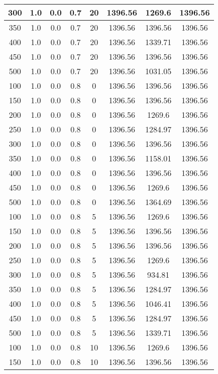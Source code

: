 \documentclass[a4paper, 12pt]{extreport}
\begin{document}
\begin{itemize}
\begin{longtable}{|c|c|c|c|c|c|c|c|}
			300 & 1.0 & 0.0 & 0.7 & 20 & 1396.56 & 1269.6 & 1396.56 \\\hline
			350 & 1.0 & 0.0 & 0.7 & 20 & 1396.56 & 1396.56 & 1396.56 \\\hline
			400 & 1.0 & 0.0 & 0.7 & 20 & 1396.56 & 1339.71 & 1396.56 \\\hline
			450 & 1.0 & 0.0 & 0.7 & 20 & 1396.56 & 1396.56 & 1396.56 \\\hline
			500 & 1.0 & 0.0 & 0.7 & 20 & 1396.56 & 1031.05 & 1396.56 \\\hline
			100 & 1.0 & 0.0 & 0.8 & 0 & 1396.56 & 1396.56 & 1396.56 \\\hline
			150 & 1.0 & 0.0 & 0.8 & 0 & 1396.56 & 1396.56 & 1396.56 \\\hline
			200 & 1.0 & 0.0 & 0.8 & 0 & 1396.56 & 1269.6 & 1396.56 \\\hline
			250 & 1.0 & 0.0 & 0.8 & 0 & 1396.56 & 1284.97 & 1396.56 \\\hline
			300 & 1.0 & 0.0 & 0.8 & 0 & 1396.56 & 1396.56 & 1396.56 \\\hline
			350 & 1.0 & 0.0 & 0.8 & 0 & 1396.56 & 1158.01 & 1396.56 \\\hline
			400 & 1.0 & 0.0 & 0.8 & 0 & 1396.56 & 1396.56 & 1396.56 \\\hline
			450 & 1.0 & 0.0 & 0.8 & 0 & 1396.56 & 1269.6 & 1396.56 \\\hline
			500 & 1.0 & 0.0 & 0.8 & 0 & 1396.56 & 1364.69 & 1396.56 \\\hline
			100 & 1.0 & 0.0 & 0.8 & 5 & 1396.56 & 1269.6 & 1396.56 \\\hline
			150 & 1.0 & 0.0 & 0.8 & 5 & 1396.56 & 1396.56 & 1396.56 \\\hline
			200 & 1.0 & 0.0 & 0.8 & 5 & 1396.56 & 1396.56 & 1396.56 \\\hline
			250 & 1.0 & 0.0 & 0.8 & 5 & 1396.56 & 1269.6 & 1396.56 \\\hline
			300 & 1.0 & 0.0 & 0.8 & 5 & 1396.56 & 934.81 & 1396.56 \\\hline
			350 & 1.0 & 0.0 & 0.8 & 5 & 1396.56 & 1284.97 & 1396.56 \\\hline
			400 & 1.0 & 0.0 & 0.8 & 5 & 1396.56 & 1046.41 & 1396.56 \\\hline
			450 & 1.0 & 0.0 & 0.8 & 5 & 1396.56 & 1284.97 & 1396.56 \\\hline
			500 & 1.0 & 0.0 & 0.8 & 5 & 1396.56 & 1339.71 & 1396.56 \\\hline
			100 & 1.0 & 0.0 & 0.8 & 10 & 1396.56 & 1269.6 & 1396.56 \\\hline
			150 & 1.0 & 0.0 & 0.8 & 10 & 1396.56 & 1396.56 & 1396.56 \\\hline

\end{longtable}
\end{itemize}
\end{document}
